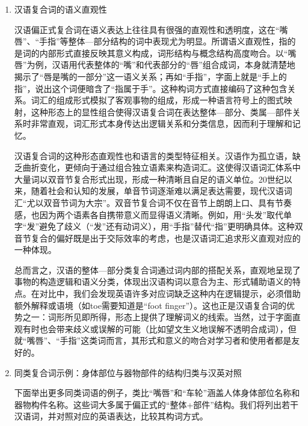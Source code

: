 \documentclass[10pt]{ctexart}
\begin{document}
\begin{enumerate}
    \item 汉语复合词的语义直观性
    
    汉语偏正式复合词在语义表达上往往具有很强的直观性和透明度，这在``嘴唇''、``手指''等整体—部分结构的词中表现尤为明显。所谓语义直观性，指的是词的内部形式直接反映其意义构成，词形结构与概念结构高度吻合。以``嘴唇''为例，汉语用代表整体的``嘴''和代表部分的``唇''组合成词，本身就清楚地揭示了``唇是嘴的一部分''这一语义关系；再如``手指''，字面上就是``手上的指''，说出这个词便暗含了``指属于手''。这种构词方式直接编码了这种包含关系。词汇的组成形式模拟了客观事物的组成，形成一种语言符号上的图式映射，这种形态上的显性组合使得汉语复合词在表达整体—部分、类属—部件关系时非常直观，词汇形式本身传达出逻辑关系和分类信息，因而利于理解和记忆。

    汉语复合词的这种形态直观性也和语言的类型特征相关。汉语作为孤立语，缺乏曲折变化，更倾向于通过组合独立语素来构造词汇。这使得汉语词汇体系中大量词以双音节复合形式出现，形成一种清晰且自足的语义单位。20世纪以来，随着社会和认知的发展，单音节词逐渐难以满足表达需要，现代汉语词汇``尤以双音节词为大宗''。双音节复合词不仅在音节上朗朗上口、具有节奏感，也因为两个语素各自携带意义而显得语义清晰。例如，用``头发''取代单字``发''避免了歧义（``发''还有动词义），用``手指''替代``指''更明确具体。这种双音节复合的偏好既是出于交际效率的考虑，也是汉语词汇追求形义直观对应的一种体现。

    总而言之，汉语的整体—部分类复合词通过词内部的搭配关系，直观地呈现了事物的构造逻辑和语义分类，体现出汉语构词以意合为主、形式辅助语义的特点。在对比中，我们会发现英语许多对应词缺乏这种内在逻辑提示，必须借助额外解释或语境（如toe需要知道是``foot finger''）。这也正是汉语复合词的优势之一：词形所见即所得，形态上提供了理解词义的线索。当然，过于字面直观有时也会带来歧义或误解的可能（比如望文生义地误解不透明合成词），但就``嘴唇''、``手指''这类词而言，其形式和意义的吻合对学习者和使用者都是友好的。

    \item 同类复合词示例：身体部位与器物部件的结构归类与汉英对照
    
    下面举出更多同类词语的例子，类比``嘴唇''和``车轮''涵盖人体身体部位名称和器物构件名称。这些词大多属于偏正式的``整体+部件''结构。我们将列出若干汉语词，并对照对应的英语表达，比较其构词方式。


\end{enumerate}
\end{document}
